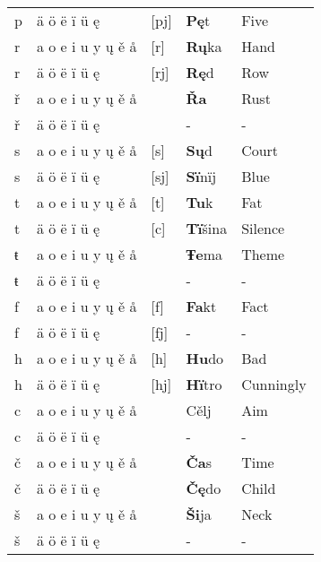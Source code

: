 \begin{longtable}{lllll}
		p & ä ö ë ï ü ę & [pj] & \textbf{Pę}t & Five \\ 
		r & a o e i u y ų ě å & [r] & \textbf{Rų}ka & Hand \\  
		r & ä ö ë ï ü ę & [rj] & \textbf{Rę}d & Row \\
		ř & a o e i u y ų ě å & \textipa{[\r*r]} & \textbf{Řa} & Rust \\  
		ř & ä ö ë ï ü ę & \textipa{[\r*rj]} & - & - \\ 
		s & a o e i u y ų ě å & [s] & \textbf{Sų}d & Court \\  
		s & ä ö ë ï ü ę & [sj] & \textbf{Sï}nïj & Blue \\ 
		t & a o e i u y ų ě å & [t] & \textbf{Tu}k & Fat \\ 
		t & ä ö ë ï ü ę & [c] & \textbf{Tï}šina & Silence \\ 
		ŧ & a o e i u y ų ě å & \textipa{[T]} & \textbf{Ŧe}ma & Theme \\  
		ŧ & ä ö ë ï ü ę & \textipa{[Tj]} & - & - \\ 
		f & a o e i u y ų ě å & [f] & \textbf{Fa}kt & Fact \\  
		f & ä ö ë ï ü ę & [fj] & - & - \\
		h & a o e i u y ų ě å & [h] & \textbf{Hu}do & Bad \\
		h & ä ö ë ï ü ę & [hj] & \textbf{Hï}tro & Cunningly \\
		c & a o e i u y ų ě å & \textipa{[\t{ts}]} & Cělj & Aim \\
		c & ä ö ë ï ü ę & \textipa{[\t{tsj}]} & - & - \\
		č & a o e i u y ų ě å & \textipa{[\t{tS}]} & \textbf{Ča}s & Time \\
		č & ä ö ë ï ü ę & \textipa{[\t{tSj}]} & \textbf{Čę}do & Child \\
		š & a o e i u y ų ě å & \textipa{[\v{s}]} & \textbf{Ši}ja & Neck \\
		š & ä ö ë ï ü ę & \textipa{[\v{s}j]} & - & - \\		
\end{longtable}
